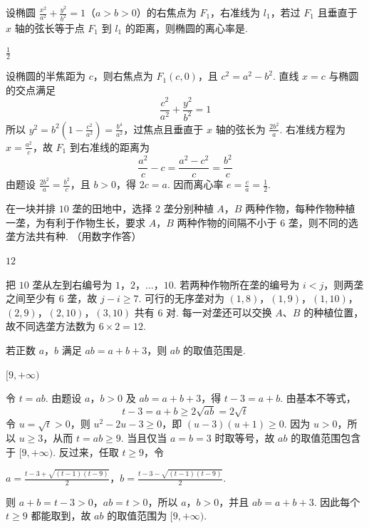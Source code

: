 \begin{problem}
设椭圆 \(\frac{x^2}{a^2}+\frac{y^2}{b^2}=1\)（\(a>b>0\)）的右焦点为 \(F_1\)，右准线为 \(l_1\)，若过 \(F_1\) 且垂直于 \(x\) 轴的弦长等于点 \(F_1\) 到 \(l_1\) 的距离，则椭圆的离心率是\fillinblank{}.
\end{problem}

\begin{answer}
\(\frac12\)
\end{answer}

\begin{solution}
设椭圆的半焦距为 \(c\)，则右焦点为 \(F_1(c,0)\)，且
\(c^2=a^2-b^2\). 直线 \(x=c\) 与椭圆的交点满足
\[
\frac{c^2}{a^2}+\frac{y^2}{b^2}=1
\]
所以 \(y^2=b^2\left(1-\frac{c^2}{a^2}\right)=\frac{b^4}{a^2}\)，过焦点且垂直于 \(x\) 轴的弦长为
\(\frac{2b^2}{a}\). 右准线方程为 \(x=\frac{a^2}{c}\)，故 \(F_1\) 到右准线的距离为
\[
\frac{a^2}{c}-c=\frac{a^2-c^2}{c}=\frac{b^2}{c}
\]
由题设 \(\frac{2b^2}{a}=\frac{b^2}{c}\)，且 \(b>0\)，得 \(2c=a\). 因而离心率
\(e=\frac ca=\frac12\).
\end{solution}

\begin{problem}
在一块并排 \(10\) 垄的田地中，选择 \(2\) 垄分别种植 \(A\)，\(B\) 两种作物，每种作物种植一垄，为有利于作物生长，要求 \(A\)，\(B\) 两种作物的间隔不小于 \(6\) 垄，则不同的选垄方法共有\fillinblank{}种. （用数字作答）
\end{problem}

\begin{answer}
\(12\)
\end{answer}

\begin{solution}
把 \(10\) 垄从左到右编号为 \(1\)，\(2\)，\(\ldots\)，\(10\). 若两种作物所在垄的编号为 \(i<j\)，则两垄之间至少有 \(6\) 垄，故 \(j-i\ge7\). 可行的无序垄对为
\((1,8)\)，\((1,9)\)，\((1,10)\)，\((2,9)\)，\((2,10)\)，\((3,10)\)
共有 \(6\) 对. 每一对垄还可以交换 \(A\)、\(B\) 的种植位置，故不同选垄方法数为
\(6\times2=12\).
\end{solution}

\begin{problem}
若正数 \(a\)，\(b\) 满足 \(ab=a+b+3\)，则 \(ab\) 的取值范围是\fillinblank{}.
\end{problem}

\begin{answer}
\([9,+\infty)\)
\end{answer}

\begin{solution}
令 \(t=ab\). 由题设 \(a\)，\(b>0\) 及 \(ab=a+b+3\)，得
\(t-3=a+b\). 由基本不等式，
\[
t-3=a+b\ge2\sqrt{ab}=2\sqrt t
\]
令 \(u=\sqrt t>0\)，则 \(u^2-2u-3\ge0\)，即
\((u-3)(u+1)\ge0\). 因为 \(u>0\)，所以 \(u\ge3\)，从而 \(t=ab\ge9\). 当且仅当 \(a=b=3\) 时取等号，故
\(ab\) 的取值范围包含于 \([9,+\infty)\). 反过来，任取 \(t\ge9\)，令

\(a=\frac{t-3+\sqrt{(t-1)(t-9)}}{2}\)，\(b=\frac{t-3-\sqrt{(t-1)(t-9)}}{2}\).

则 \(a+b=t-3>0\)，\(ab=t>0\)，所以 \(a\)，\(b>0\)，并且 \(ab=a+b+3\). 因此每个 \(t\ge9\) 都能取到，故
\(ab\) 的取值范围为 \([9,+\infty)\).
\end{solution}

